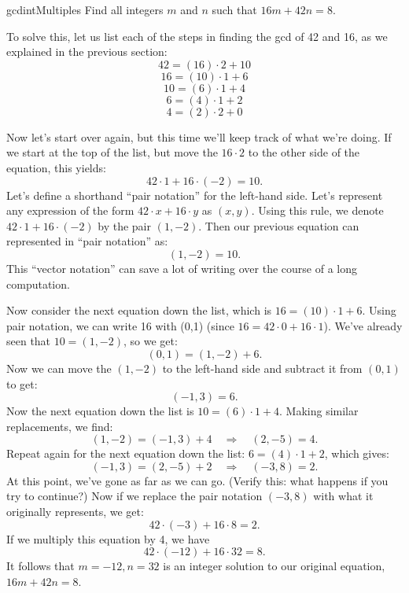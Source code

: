 \begin{example}{gcdintMultiples}
Find all integers $m$ and $n$ such that $16 m + 42 n = 8$.

To solve this, let us list each of the steps in finding the gcd of 42 and 16, as we explained in the previous section:
\[ 42 = (16)\cdot 2 + 10\]
\[ 16 = (10)\cdot 1 + 6\]
\[ 10 = (6)\cdot 1 + 4\]
\[ 6 = (4)\cdot 1 + 2\]
\[ 4 = (2)\cdot 2 + 0\]

Now let's start over again, but this time we'll keep track of what we're doing. If we start at the top of the list, but move the $16\cdot2$ to the other side of the equation, this yields:
\[ 42 \cdot 1 + 16 \cdot (-2) = 10.\]
Let's define a shorthand ``pair notation'' for the left-hand side. Let's represent any expression of the form $42\cdot x + 16 \cdot y$ as $(x,y)$. Using this rule, we denote $42 \cdot 1 + 16 \cdot (-2)$ by the pair $(1,-2)$.  Then our previous equation can represented  in ``pair notation'' as:
\[ (1,-2) = 10.\]
This ``vector notation'' can save a lot of writing over the course of a long computation.

Now consider the next equation down the list, which is 
$ 16 = (10)\cdot 1 + 6 $.
Using pair notation, we can write 16 with (0,1)  (since $16 = 42 \cdot 0 + 16 \cdot 1$). We've already seen that $10 = (1,-2)$, so we get:
\[(0,1) = (1,-2) + 6.\]
Now we can move the $(1,-2)$ to the left-hand side and subtract it from $(0,1)$ to get:
\[ (-1,3) = 6. \]
Now the next equation down the list is $10 = (6)\cdot 1 + 4$. 
Making similar replacements, we find:
\[(1,-2) = (-1,3) + 4\quad\Rightarrow\quad (2,-5) = 4.\]
Repeat again for the next equation down the list:
$ 6 = (4)\cdot 1 + 2$, which gives:
\[ (-1,3) = (2,-5) + 2 \quad\Rightarrow\quad (-3,8) = 2.\]  
At this point, we've gone as far as we can go.  (Verify this: what happens if you try to continue?) Now if we replace the pair notation $(-3,8)$ with what it originally represents, we get:
\[42\cdot ( -3) + 16 \cdot 8 = 2.\]
If we multiply this equation by 4, we have
\[42 \cdot( -12) + 16 \cdot 32 = 8.\]
It follows that $m=-12, n=32$ is an integer solution to our original equation, $16m + 42n = 8$.


\end{example}
